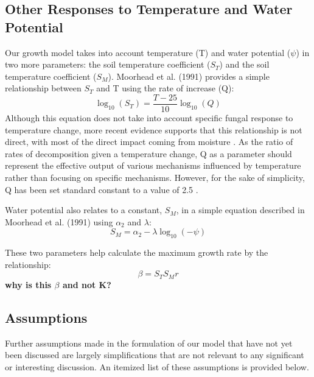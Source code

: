 \documentclass[12pt]{article}
\begin{document}
\begin{multicols}{2}	
\subsection{Other Responses to Temperature and Water Potential}

Our growth model takes into account temperature (T) and water potential ($\psi$) in two more parameters: the soil temperature coefficient ($S_T$) and the soil temperature coefficient ($S_M$). Moorhead et al. (1991) provides a simple relationship between $S_T$ and T using the rate of increase (Q):
\begin{equation}
\log_{10}(S_T) = \frac{T-25}{10}\log_{10}(Q)
\end{equation}
Although this equation does not take into account specific fungal response to temperature change, more recent evidence supports that this relationship is not direct, with most of the direct impact coming from moisture \cite{Petraglia2018}. As the ratio of rates of decomposition given a temperature change, Q as a parameter should represent the effective output of various mechanisms influenced by temperature rather than focusing on specific mechanisms. However, for the sake of simplicity, Q has been set standard constant to a value of 2.5 \cite{Moorhead1991}.

Water potential also relates to a constant, $S_M$, in a simple equation described in Moorhead et al. (1991) using $\alpha_2$ and $\lambda$:
\begin{equation}
S_M = \alpha_2 -\lambda \log_{10}(-\psi)
\end{equation}

These two parameters help calculate the maximum growth rate by the relationship:
\begin{equation}
\beta = S_T S_M r
\end{equation}
\textbf{why is this $\beta$ and not K?} 

\subsection{Assumptions}

Further assumptions made in the formulation of our model that have not yet been discussed are largely simplifications that are not relevant to any significant or interesting discussion. An itemized list of these assumptions is provided below.

\end{multicols}
\end{document}
